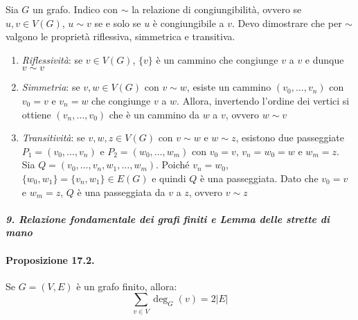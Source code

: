 \documentclass[12pt, a4paper]{report}
\theoremstyle{definition}
\begin{document}
\begin{demonstration}
    Sia $G$ un grafo. Indico con $\sim$ la relazione di congiungibilità, ovvero se
    $u,v\in V(G)$, $u\sim v$ se e solo se $u$ è congiungibile a $v$. Devo dimostrare
    che per $\sim$ valgono le proprietà riflessiva, simmetrica e transitiva.
    \begin{enumerate}[label=(\roman*)]
        \item \emph{Riflessività}: se $v\in V(G)$, $\{v\}$ è un cammino che
        congiunge $v$ a $v$ e dunque $v\sim v$
        \item \emph{Simmetria}: se $v,w\in V(G)$ con $v\sim w$, esiste un cammino
        $(v_0,\dots,v_n)$ con $v_0=v$ e $v_n=w$ che congiunge $v$ a $w$. Allora,
        invertendo l'ordine dei vertici si ottiene $(v_n,\dots,v_0)$ che è un
        cammino da $w$ a $v$, ovvero $w\sim v$
        \item \emph{Transitività}: se $v,w,z\in V(G)$ con $v\sim w$ e $w\sim z$,
        esistono due passeggiate $P_1=(v_0,\dots,v_n)$ e $P_2=(w_0,\dots,w_m)$
        con $v_0=v$, $v_n=w_0=w$ e $w_m=z$. Sia $Q=(v_0,\dots,v_n,w_1,\dots,w_m)$.
        Poiché $v_n=w_0$, $\{w_0,w_1\}=\{v_n,w_1\}\in E(G)$ e quindi $Q$ è una
        passeggiata. Dato che $v_0=v$ e $w_m=z$, $Q$ è una passeggiata da $v$ a $z$,
        ovvero $v\sim z$
    \end{enumerate}
\end{demonstration}

\newpage
\paragraph{\emph{9. Relazione fondamentale dei grafi finiti e Lemma delle strette
di mano}}
\paragraph{Proposizione 17.2.}
Se $G=(V,E)$ è un grafo finito, allora:
\[\sum_{v\in V}\deg_G(v)=2|E|\]
\end{document}
